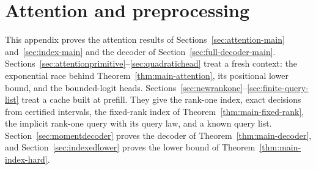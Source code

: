\section{Attention and preprocessing}\label{app:attention}

This appendix proves the attention results of
Sections~\ref{sec:attention-main} and~\ref{sec:index-main} and the
decoder of Section~\ref{sec:full-decoder-main}.
Sections~\ref{sec:attentionprimitive}--\ref{sec:quadratichead} treat a
fresh context: the exponential race behind
Theorem~\ref{thm:main-attention}, its positional lower bound, and the
bounded-logit heads.
Sections~\ref{sec:newrankone}--\ref{sec:finite-query-list} treat a cache
built at prefill. They give the rank-one index, exact decisions from
certified intervals, the fixed-rank index of
Theorem~\ref{thm:main-fixed-rank}, the implicit rank-one query with its
query law, and a known query list. Section~\ref{sec:momentdecoder}
proves the decoder of Theorem~\ref{thm:main-decoder}, and
Section~\ref{sec:indexedlower} proves the lower bound of
Theorem~\ref{thm:main-index-hard}.











